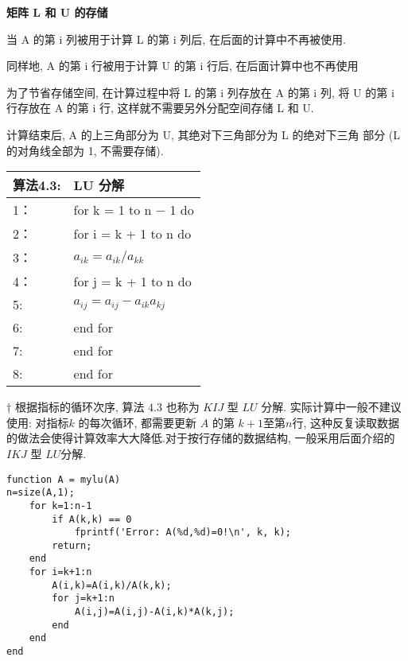 \documentclass[12pt,a4paper]{article}
\begin{document}
{\bfseries 矩阵 L 和 U 的存储}

当 A 的第 i 列被用于计算 L 的第 i 列后, 在后面的计算中不再被使用.

同样地, A 的第 i 行被用于计算 U 的第 i 行后, 在后面计算中也不再使用

\begin{framed}
	为了节省存储空间, 在计算过程中将 L 的第 i 列存放在 A 的第 i 列, 将
	U 的第 i 行存放在 A 的第 i 行, 这样就不需要另外分配空间存储 L 和 U.
\end{framed}

计算结束后, A 的上三角部分为 U, 其绝对下三角部分为 L 的绝对下三角
部分 (L 的对角线全部为 1, 不需要存储).

\begin{table}  
	\begin{tabular*}{16cm}{ll}  
		\hline  
		算法4.3: & LU 分解 \\  
		\hline  
		1：   &for k = 1 to n − 1 do\\  
		2：   &\qquad for i = k + 1 to n do\\
		3：   &\qquad \qquad $a_{ik} = a_{ik}/a_{kk}$\\
		4：   &\qquad \qquad for j = k + 1 to n do\\
		5:    &\qquad \qquad \qquad $a_{ij} = a_{ij} − a_{ik}a_{kj}$\\
		6:    &\qquad \qquad end for\\
		7:    &\qquad end for\\
		8:    &end for \\
		\hline  
	\end{tabular*}  
\end{table} 

\begin{framed}
	
	† 根据指标的循环次序, 算法 $4.3$ 也称为 $KIJ$ 型 $LU$ 分解. 实际计算中一般不建议使用: 对指标$k$ 的每次循环, 都需要更新 $A$ 的第 $k + 1 $至第$n $行, 这种反复读取数据的做法会使得计算效率大大降低.对于按行存储的数据结构, 一般采用后面介绍的 $IKJ$ 型 $LU$分解.
	
\end{framed}






	
\begin{lstlisting}[language={[ANSI]C}] 
% Matlab code 1 : LU 分解
function A = mylu(A)
n=size(A,1);
	for k=1:n-1
		if A(k,k) == 0
			fprintf('Error: A(%d,%d)=0!\n', k, k);
		return;
	end
	for i=k+1:n
		A(i,k)=A(i,k)/A(k,k);
		for j=k+1:n
			A(i,j)=A(i,j)-A(i,k)*A(k,j);
		end
	end
end
\end{lstlisting}
\end{document}
